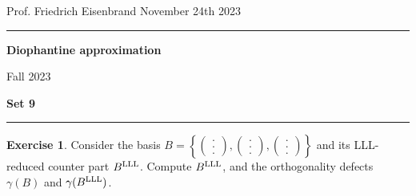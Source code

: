 \documentclass[12pt,a4paper]{article}
\date{}
\theoremstyle{plain}
\newtheorem*{Sol*}{Solution}
\theoremstyle{definition}
\newtheorem{Ex}{Exercise}
\newif\ifsolutions
\newcommand{\exercise}[2]{
			\begin{Ex} #1 \end{Ex}
			\ifsolutions  \begin{Sol*} #2 \end{Sol*} \bigskip \else \bigskip  \fi
		}
\begin{document}
\begin{center}
{Prof. Friedrich Eisenbrand \hfill November 24th 2023}
\end{center}
	
\hrule\vspace{\baselineskip}

\begin{center}
\textbf{Diophantine approximation}

Fall 2023

\bigskip

\textbf{Set 9}
\ifsolutions{\textbf{- Solutions}} \else{} \fi
\end{center}

\hrule\vspace{\baselineskip}




\exercise{
	Consider the basis $B = \left\{ \begin{pmatrix} . \\ . \\ . \end{pmatrix}, \begin{pmatrix} . \\ . \\ . \end{pmatrix}, \begin{pmatrix} . \\ . \\ . \end{pmatrix} \right\}$ and its LLL-reduced counter part $B^{{\rm LLL}}$.
	Compute $B^{{\rm LLL}}$, and the orthogonality defects $\gamma(B)$ and $\gamma(B^{{\rm LLL}})$.}
{}
\end{document}
